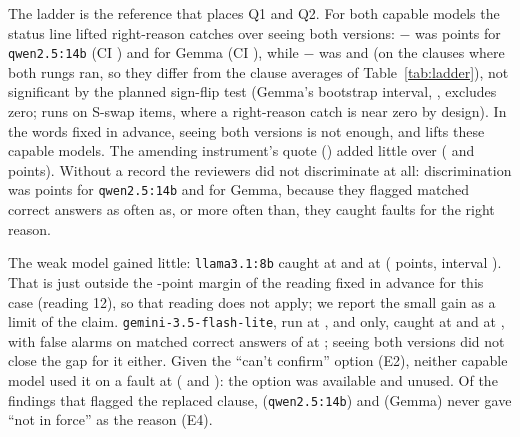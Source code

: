 The ladder is the reference that places Q1 and Q2. For both capable models the status line lifted right-reason
catches over seeing both versions: $-$ was \DiffRFourMinusRTwoQwenFourteen{} points for
\texttt{qwen2.5:14b} (CI \CIRFourMinusRTwoQwenFourteen) and \DiffRFourMinusRTwoGemma{} for Gemma (CI
\CIRFourMinusRTwoGemma), while $-$ was \DiffRTwoMinusRZeroQwenFourteen{} and
\DiffRTwoMinusRZeroGemma{} (on the \ClausesRTwoMinusRZeroGemma{} clauses where both rungs ran, so they differ from the
clause averages of Table~\ref{tab:ladder}), not significant by the planned sign-flip test (Gemma's bootstrap interval,
\CIRTwoMinusRZeroGemma, excludes zero;  runs on S-swap items, where a right-reason catch is near zero by
design). In the words fixed in advance, seeing both versions is not enough, and
 lifts these capable models. The amending instrument's quote () added little over 
(\DiffRThreeMinusRTwoQwenFourteen{} and \DiffRThreeMinusRTwoGemma{} points). Without a record the reviewers did
not discriminate at all:  discrimination was \DiscRTwoQwenFourteen{} points for \texttt{qwen2.5:14b} and
\DiscRTwoGemma{} for Gemma, because they flagged matched correct answers as often as, or more often than, they caught faults for
the right reason.

The weak model gained little: \texttt{llama3.1:8b} caught \CatchLlamaRTwo{} at  and \CatchLlamaRFour{} at
 (\DiffRFourMinusRTwoLlama{} points, interval \CIRFourMinusRTwoLlama). That is just outside the
\InterpPoints-point margin of the reading fixed in advance for this case (reading 12), so that reading does not apply;
we report the small gain as a limit of the claim. \texttt{gemini-3.5-flash-lite}, run at ,  and  only, caught
\CatchFlashRTwo{} at  and \CatchFlashRFour{} at , with false alarms on matched correct answers
of \FAMFlashRFour{} at ; seeing both versions did not close the gap for it either. Given the ``can't confirm'' option (E2), neither capable model used it on a fault at 
(\CantConfirmKNQwenFourteenRTwoCC{} and \CantConfirmKNGemmaRTwoCC): the option was available and unused. Of the
 findings that flagged the replaced clause, \MisnamedKNQwenFourteenRTwo{} (\texttt{qwen2.5:14b}) and
\MisnamedKNGemmaRTwo{} (Gemma) never gave ``not in force'' as the reason (E4).

